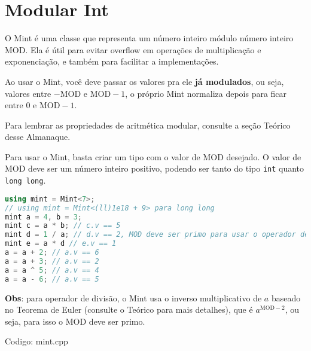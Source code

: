 \documentclass[10pt, a4paper, oneside]{book}
\begin{document}
\section{Modular Int}


O Mint é uma classe que representa um número inteiro módulo número inteiro $\text{MOD}$. Ela é útil para evitar overflow em operações de multiplicação e exponenciação, e também para facilitar a implementações.



Ao usar o Mint, você deve passar os valores pra ele \textbf{já modulados}, ou seja, valores entre $-\text{MOD}$ e $\text{MOD}-1$, o próprio Mint normaliza depois para ficar entre $0$ e $\text{MOD}-1$.



Para lembrar as propriedades de aritmética modular, consulte a seção Teórico desse Almanaque.



Para usar o Mint, basta criar um tipo com o valor de $\text{MOD}$ desejado. O valor de $\text{MOD}$ deve ser um número inteiro positivo, podendo ser tanto do tipo \texttt{int} quanto \texttt{long long}.



\begin{lstlisting}[language=C++]
using mint = Mint<7>;
// using mint = Mint<(ll)1e18 + 9> para long long
mint a = 4, b = 3;
mint c = a * b; // c.v == 5
mint d = 1 / a; // d.v == 2, MOD deve ser primo para usar o operador de divisão
mint e = a * d // e.v == 1
a = a + 2; // a.v == 6
a = a + 3; // a.v == 2
a = a ^ 5; // a.v == 4
a = a - 6; // a.v == 5
\end{lstlisting}



\textbf{Obs}: para operador de divisão, o Mint usa o inverso multiplicativo de $a$ baseado no Teorema de Euler (consulte o Teórico para mais detalhes), que é $a^{\text{MOD}-2}$, ou seja, para isso o $\text{MOD}$ deve ser primo.

\hfill

Codigo: mint.cpp
\end{document}
